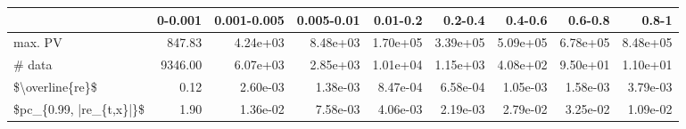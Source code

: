 \begin{tabular}{lrrrrrrrr}
\toprule
{} &  0-0.001 &  0.001-0.005 &  0.005-0.01 &  0.01-0.2 &   0.2-0.4 &   0.4-0.6 &   0.6-0.8 &     0.8-1 \\
\midrule
max. PV                 &   847.83 &     4.24e+03 &    8.48e+03 &  1.70e+05 &  3.39e+05 &  5.09e+05 &  6.78e+05 &  8.48e+05 \\
\# data                  &  9346.00 &     6.07e+03 &    2.85e+03 &  1.01e+04 &  1.15e+03 &  4.08e+02 &  9.50e+01 &  1.10e+01 \\
\$\textbackslash overline\{re\}\$         &     0.12 &     2.60e-03 &    1.38e-03 &  8.47e-04 &  6.58e-04 &  1.05e-03 &  1.58e-03 &  3.79e-03 \\
\$pc\_\{0.99, |re\_\{t,x\}|\}\$ &     1.90 &     1.36e-02 &    7.58e-03 &  4.06e-03 &  2.19e-03 &  2.79e-02 &  3.25e-02 &  1.09e-02 \\
\bottomrule
\end{tabular}
